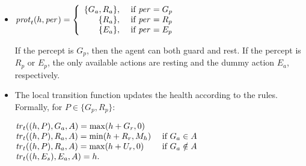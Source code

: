 \begin{example}
\begin{itemize}[$\bullet$]
    
  \item $\mathit{prot}_{t}(h,\mathit{per}_{}) = \left\{
      \begin{array}{rl}
        \{G_a, R_a\}, & \text{ if } \mathit{per}_{} = G_p\\ 
        \{R_a\}, & \text{ if } \mathit{per}_{} = R_p\\ 
        \{E_a\}, & \text{ if } \mathit{per}_{} = E_p\\
      \end{array} \right.$

    If the percept is $G_p$, then the agent can both guard and rest. If the
    percept is $R_p$ or $E_p$, the only available actions are resting and the
    dummy action $E_a$, respectively.
    
  \item The local transition function updates the health according to the
    rules. Formally, for $P \in \{G_p,R_p\}$:

    $\begin{array}{@{}l@{\quad}l}\small
       \tr{t}((h,P), G_a, A) = \max(h + G_r,0) &\\%
       \tr{t}((h,P), R_a, A) = \min(h + R_r, M_h) &\text{ if }G_a\in A\\
       \tr{t}((h,P), R_a, A) = \max(h + U_r,0) &\text{ if }G_a\notin A\\%
       
       \tr{t}((h,E_s), E_a, A) = h.\\
     \end{array}$

\end{itemize}

\end{example}

  
